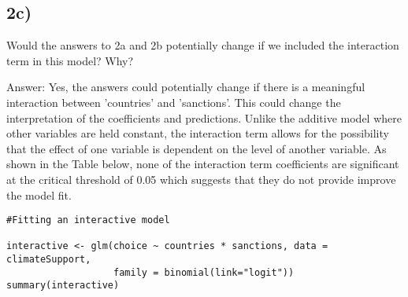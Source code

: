 \documentclass{article}
\begin{document}
\subsection{2c)}    
Would the answers to 2a and 2b potentially change if we included the interaction term in this model? Why? 

Answer: Yes, the answers could potentially change if there is a meaningful interaction between 'countries' and 'sanctions'. This could change the interpretation of the coefficients and predictions. Unlike the additive model where other variables are held constant, the interaction term allows for the possibility that the effect of one variable is dependent on the level of another variable. 
As shown in the Table below, none of the interaction term coefficients are 
significant at the critical threshold of 0.05 which suggests that they do 
not provide improve the model fit.
\begin{verbatim}
#Fitting an interactive model

interactive <- glm(choice ~ countries * sanctions, data = climateSupport,
                   family = binomial(link="logit"))
summary(interactive)

\end{verbatim}
\end{document}

